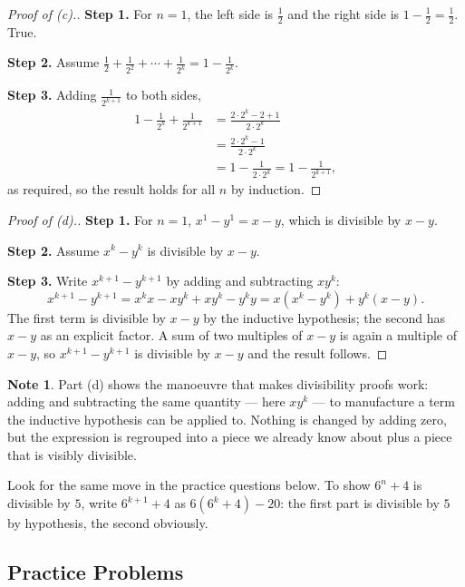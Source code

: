 \documentclass[11pt,a4paper]{article}
\theoremstyle{definition}
\newtheorem{note}[thm]{Note}
\begin{document}
\begin{proof}[\textit{Proof of }(c).]
\textbf{Step 1.} For $n=1$, the left side is $\frac{1}{2}$ and the right side is
$1-\frac{1}{2}=\frac{1}{2}$. True.

\textbf{Step 2.} Assume
$\frac{1}{2}+\frac{1}{2^{2}}+\cdots+\frac{1}{2^{k}}=1-\frac{1}{2^{k}}$.

\textbf{Step 3.} Adding $\frac{1}{2^{k+1}}$ to both sides,
\begin{align*}
1-\frac{1}{2^{k}}+\frac{1}{2^{k+1}}
 &= \frac{2\cdot 2^{k}-2+1}{2\cdot 2^{k}}\\
 &= \frac{2\cdot 2^{k}-1}{2\cdot 2^{k}}\\
 &= 1-\frac{1}{2\cdot 2^{k}}
  = 1-\frac{1}{2^{k+1}},
\end{align*}
as required, so the result holds for all $n$ by induction.
\end{proof}

\begin{proof}[\textit{Proof of }(d).]
\textbf{Step 1.} For $n=1$, $x^{1}-y^{1}=x-y$, which is divisible by $x-y$.

\textbf{Step 2.} Assume $x^{k}-y^{k}$ is divisible by $x-y$.

\textbf{Step 3.} Write $x^{k+1}-y^{k+1}$ by adding and subtracting $xy^{k}$:
$$x^{k+1}-y^{k+1}=x^{k}x-xy^{k}+xy^{k}-y^{k}y
=x\left(x^{k}-y^{k}\right)+y^{k}(x-y).$$
The first term is divisible by $x-y$ by the inductive hypothesis; the second has
$x-y$ as an explicit factor. A sum of two multiples of $x-y$ is again a multiple of
$x-y$, so $x^{k+1}-y^{k+1}$ is divisible by $x-y$ and the result follows.
\end{proof}

\begin{note}
Part (d) shows the manoeuvre that makes divisibility proofs work: adding and
subtracting the same quantity --- here $xy^{k}$ --- to manufacture a term the
inductive hypothesis can be applied to. Nothing is changed by adding zero, but the
expression is regrouped into a piece we already know about plus a piece that is
visibly divisible.

Look for the same move in the practice questions below. To show $6^{n}+4$ is
divisible by $5$, write $6^{k+1}+4$ as $6\left(6^{k}+4\right)-20$: the first part
is divisible by $5$ by hypothesis, the second obviously.
\end{note}

\subsection{Practice Problems}
\end{document}

